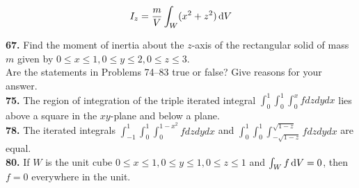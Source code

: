 \documentclass[11pt]{report}
\begin{document}
\[I_z = \frac{m}{V} \int _W (x^2 + z^2) \, \text d V \]

\textbf{67.} Find the moment of inertia about the $z$-axis of the rectangular
solid of mass $m$ given by $0 \leq x \leq 1, 0 \leq y \leq 2, 0 \leq z \leq 3$. \\

Are the statements in Problems 74–83 true or false? Give reasons for your answer. \\

\textbf{75.} The region of integration of the triple iterated integral
$\int_0^1 \int_0^1 \int_0^x f dz dy dx $ lies above a square in the $xy$-plane
and below a plane. \\

\textbf{78.} The iterated integrals $\int_{-1}^1 \int_0^1 \int_0^{1-x^2} f dz dy dx $
and $\int_0^1 \int_0^1 \int_{-\sqrt{1-z}}^{\sqrt{1-z}} f dz dy dx $ are equal. \\


\textbf{80.} If $W$ is the unit cube $0 \leq x \leq 1, 0 \leq y \leq 1, 0 \leq z \leq 1$
and $ \int _W f \, \text dV = 0$, then $f = 0$ everywhere in the unit. \\
\end{document}
